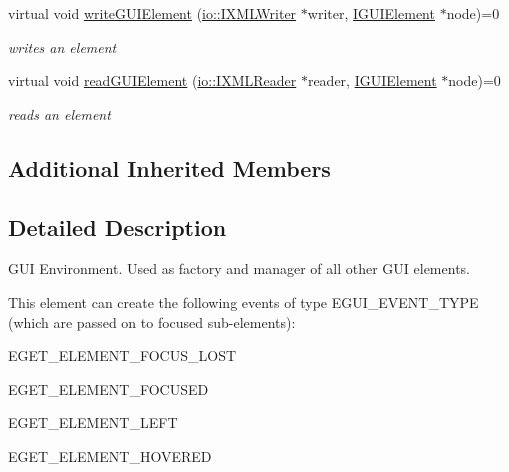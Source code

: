 \begin{DoxyCompactItemize}
\mbox{\label{classirr_1_1gui_1_1IGUIEnvironment_a30fb040bf48603fd309632e9c60b3583}} 
virtual void \hyperlink{classirr_1_1gui_1_1IGUIEnvironment_a30fb040bf48603fd309632e9c60b3583}{write\+G\+U\+I\+Element} (\hyperlink{classirr_1_1io_1_1IXMLWriter}{io\+::\+I\+X\+M\+L\+Writer} $\ast$writer, \hyperlink{classirr_1_1gui_1_1IGUIElement}{I\+G\+U\+I\+Element} $\ast$node)=0
\begin{DoxyCompactList}\small\item\em writes an element \end{DoxyCompactList}\item 
\mbox{\label{classirr_1_1gui_1_1IGUIEnvironment_acdfcdf6330e7475e3fdfd42f43c5f6df}} 
virtual void \hyperlink{classirr_1_1gui_1_1IGUIEnvironment_acdfcdf6330e7475e3fdfd42f43c5f6df}{read\+G\+U\+I\+Element} (\hyperlink{namespaceirr_1_1io_a9dc6291fb7e4c73155a3e3c8339f9bff}{io\+::\+I\+X\+M\+L\+Reader} $\ast$reader, \hyperlink{classirr_1_1gui_1_1IGUIElement}{I\+G\+U\+I\+Element} $\ast$node)=0
\begin{DoxyCompactList}\small\item\em reads an element \end{DoxyCompactList}\end{DoxyCompactItemize}
\subsection*{Additional Inherited Members}


\subsection{Detailed Description}
G\+UI Environment. Used as factory and manager of all other G\+UI elements. 

\begin{DoxyParagraph}{This element can create the following events of type E\+G\+U\+I\+\_\+\+E\+V\+E\+N\+T\+\_\+\+T\+Y\+PE (which are passed on to focused sub-\/elements)\+:}
\begin{DoxyItemize}
\item E\+G\+E\+T\+\_\+\+E\+L\+E\+M\+E\+N\+T\+\_\+\+F\+O\+C\+U\+S\+\_\+\+L\+O\+ST \item E\+G\+E\+T\+\_\+\+E\+L\+E\+M\+E\+N\+T\+\_\+\+F\+O\+C\+U\+S\+ED \item E\+G\+E\+T\+\_\+\+E\+L\+E\+M\+E\+N\+T\+\_\+\+L\+E\+FT \item E\+G\+E\+T\+\_\+\+E\+L\+E\+M\+E\+N\+T\+\_\+\+H\+O\+V\+E\+R\+ED \end{DoxyItemize}

\end{DoxyParagraph}


